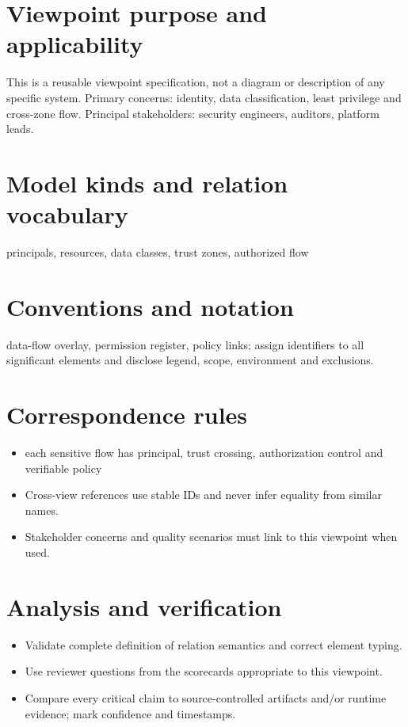 \documentclass[10pt,letterpaper]{article}
\begin{document}
\DocProvenance
\section{Viewpoint purpose and applicability}
This is a reusable viewpoint specification, not a diagram or description of any specific system. Primary concerns: identity, data classification, least privilege and cross-zone flow. Principal stakeholders: security engineers, auditors, platform leads.

\section{Model kinds and relation vocabulary}
principals, resources, data classes, trust zones, authorized flow

\section{Conventions and notation}
data-flow overlay, permission register, policy links; assign identifiers to all significant elements and disclose legend, scope, environment and exclusions.

\section{Correspondence rules}
\begin{itemize}
\item each sensitive flow has principal, trust crossing, authorization control and verifiable policy
\item Cross-view references use stable IDs and never infer equality from similar names.
\item Stakeholder concerns and quality scenarios must link to this viewpoint when used.
\end{itemize}
\section{Analysis and verification}
\begin{itemize}
\item Validate complete definition of relation semantics and correct element typing.
\item Use reviewer questions from the scorecards appropriate to this viewpoint.
\item Compare every critical claim to source-controlled artifacts and/or runtime evidence; mark confidence and timestamps.
\end{itemize}
\end{document}
